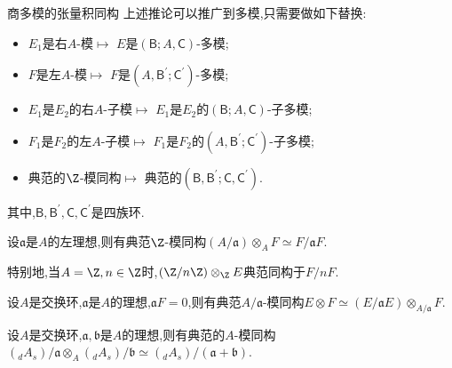 \begin{remark}{商多模的张量积同构}{}
	上述推论可以推广到多模,只需要做如下替换:
	\begin{itemize}
		\item $E_{1}$是右$A$-模$\mapsto$ $E$是$\left(\mathsf{B};A,\mathsf{C}\right)$-多模;
		\item $F$是左$A$-模$\mapsto$ $F$是$\left(A,\mathsf{B}^{\prime};\mathsf{C}^{\prime}\right)$-多模;
		\item $E_{1}$是$E_{2}$的右$A$-子模$\mapsto$ $E_{1}$是$E_{2}$的$\left(\mathsf{B};A,\mathsf{C}\right)$-子多模;
		\item $F_{1}$是$F_{2}$的左$A$-子模$\mapsto$ $F_{1}$是$F_{2}$的$\left(A,\mathsf{B}^{\prime};\mathsf{C}^{\prime}\right)$-子多模;
		\item 典范的$\Z$-模同构$\mapsto$ 典范的$\left(\mathsf{B},\mathsf{B}^{\prime};\mathsf{C},\mathsf{C}^{\prime}\right)$.
	\end{itemize}
	其中,$\mathsf{B},\mathsf{B}^{\prime},\mathsf{C},\mathsf{C}^{\prime}$是四族环.
\end{remark}

\begin{corollary}{}{}
	设$\mathfrak{a}$是$A$的左理想,则有典范$\Z$-模同构$\left(A/\mathfrak{a}\right)\otimes_{A}F\simeq F/\mathfrak{a}F$.
\end{corollary}

\begin{remark}{}{}
	特别地,当$A=\Z,n\in\Z$时,$\left(\Z/n\Z\right)\otimes_{\Z}E$典范同构于$F/nF$.
\end{remark}

\begin{corollary}{}{}
	设$A$是交换环,$\mathfrak{a}$是$A$的理想,$\mathfrak{a}F=0$,则有典范$A/\mathfrak{a}$-模同构$E\otimes F\simeq\left(E/\mathfrak{a}E\right)\otimes_{A/\mathfrak{a}}F$.
\end{corollary}

\begin{corollary}{}{}
	设$A$是交换环,$\mathfrak{a},\mathfrak{b}$是$A$的理想,则有典范的$A$-模同构$\left(_{d}A_{s}\right)/\mathfrak{a}\otimes_{A}\left(_{d}A_{s}\right)/\mathfrak{b}\simeq\left(_{d}A_{s}\right)/\left(\mathfrak{a}+\mathfrak{b}\right)$.
\end{corollary}
